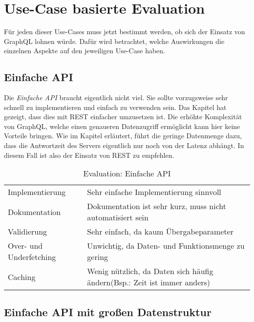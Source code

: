 \section{Use-Case basierte Evaluation}

Für jeden dieser Use-Cases muss jetzt bestimmt werden, ob sich der Einsatz von GraphQL lohnen würde. Dafür wird betrachtet, welche Auswirkungen die einzelnen Aspekte auf den jeweiligen Use-Case haben.

\subsection{Einfache API}

Die \textit{Einfache API} braucht eigentlich nicht viel. Sie sollte vorzugsweise sehr schnell zu implementieren und einfach zu verwenden sein. Das Kapitel  hat gezeigt, dass dies mit \ac{REST} einfacher umzusetzen ist. Die erhöhte Komplexität von GraphQL, welche einen genaueren Datenzugriff ermöglicht kann hier keine Vorteile bringen. Wie im Kapitel  erläutert, führt die geringe Datenmenge dazu, dass die Antwortzeit des Servers eigentlich nur noch von der Latenz abhängt. In diesem Fall ist also der Einsatz von \ac{REST} zu empfehlen.

\begin{table}[H]
\begin{tabular}{p{4cm} p{10cm}}
Implementierung & Sehr einfache Implementierung sinnvoll \\
Dokumentation & Dokumentation ist sehr kurz, muss nicht automatisiert sein \\
Validierung & Sehr einfach, da kaum Übergabeparameter \\
Over- und Underfetching & Unwichtig, da Daten- und Funktionsmenge zu gering \\
Caching & Wenig nützlich, da Daten sich häufig ändern(Bsp.: Zeit ist immer anders)
\end{tabular}
\caption{Evaluation: Einfache API}
\end{table}
\subsection{Einfache API mit großen Datenstruktur}

